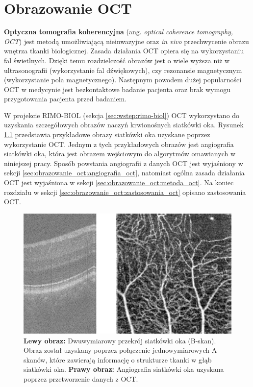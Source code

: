 %
\chapter{Obrazowanie OCT}
\label{sec:obrazowanie_oct}


\textbf{Optyczna tomografia koherencyjna} (ang. \textit{optical coherence tomography, OCT}) jest metodą umożliwiającą nieinwazyjne oraz \textit{in vivo} przechwycenie obrazu wnętrza tkanki biologicznej. Zasada działania OCT opiera się na wykorzystaniu fal świetlnych. Dzięki temu rozdzielczość obrazów jest o wiele wyższa niż w ultrasonografii (wykorzystanie fal dźwiękowych), czy rezonansie magnetycznym (wykorzystanie pola magnetycznego). Następnym powodem dużej popularności OCT w medycynie jest bezkontaktowe badanie pacjenta oraz brak wymogu przygotowania pacjenta przed badaniem.

W projekcie RIMO-BIOL (sekcja \ref{sec:wstep:rimo-biol}) OCT wykorzystano do uzyskania szczegółowych obrazów naczyń krwionośnych siatkówki oka. Rysunek \ref{fig:obrazowanie_oct:bscan_vessels} przedstawia przykładowe obrazy siatkówki oka uzyskane poprzez wykorzystanie OCT. Jednym z tych przykładowych obrazów jest angiografia siatkówki oka, która jest obrazem wejściowym do algorytmów omawianych w niniejszej pracy. Sposób powstania angiografii z danych OCT jest wyjaśniony w sekcji \ref{sec:obrazowanie_oct:angiografia_oct}, natomiast ogólna zasada działania OCT jest wyjaśniona w sekcji \ref{sec:obrazowanie_oct:metoda_oct}. Na koniec rozdziału w sekcji \ref{sec:obrazowanie_oct:zastosowania_oct} opisano zastosowania OCT.

\begin{figure}[htb]
	\centering
	\includegraphics[width=\textwidth]{gfx/bscan_vessels}
	\caption{\textbf{Lewy obraz:} Dwuwymiarowy przekrój siatkówki oka (B-skan). Obraz został uzyskany poprzez połączenie jednowymiarowych A-skanów, które zawierają informację o strukturze tkanki w głąb siatkówki oka. \textbf{Prawy obraz:} Angiografia siatkówki oka uzyskana poprzez przetworzenie danych z OCT.}
	\label{fig:obrazowanie_oct:bscan_vessels}
\end{figure}

